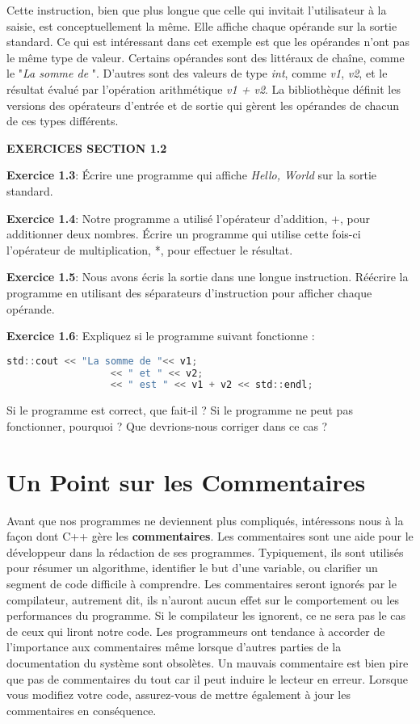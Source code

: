 Cette instruction, bien que plus longue que celle qui invitait l'utilisateur à la saisie, est conceptuellement la même. Elle affiche chaque opérande sur la sortie standard. Ce qui est intéressant dans cet exemple est que les opérandes n'ont pas le même type de valeur. Certains opérandes sont des littéraux de chaîne, comme le "\textit{La somme de }". D'autres sont des valeurs de type \textit{int}, comme \textit{v1}, \textit{v2}, et le résultat évalué par l'opération arithmétique \textit{v1 + v2}. La bibliothèque définit les versions des opérateurs d'entrée et de sortie qui gèrent les opérandes de chacun de ces types différents.

\medbreak

\textbf{EXERCICES SECTION 1.2}
\begin{shadebox}
	
	\textbf{Exercice 1.3}: Écrire une programme qui affiche \textit{Hello, World} sur la sortie standard.
	
	\textbf{Exercice 1.4}: Notre programme a utilisé l'opérateur d'addition, +, pour additionner deux nombres. Écrire un programme qui utilise cette fois-ci l'opérateur de multiplication, *, pour effectuer le résultat.
	
	\textbf{Exercice 1.5}: Nous avons écris la sortie dans une longue instruction. Réécrire la programme en utilisant des séparateurs d'instruction pour afficher chaque opérande.
	
	\textbf{Exercice 1.6}: Expliquez si le programme suivant fonctionne :
	
	\medbreak
	\begin{lstlisting}[language=C]
		std::cout << "La somme de "<< v1;
		          << " et " << v2;
		          << " est " << v1 + v2 << std::endl;
	\end{lstlisting}
	\medbreak
	
	Si le programme est correct, que fait-il ? Si le programme ne peut pas fonctionner, pourquoi ? Que devrions-nous corriger dans ce cas ?
\end{shadebox}  

\medbreak  

\section{Un Point sur les Commentaires}
Avant que nos programmes ne deviennent plus compliqués, intéressons nous à la façon dont C++ gère les \textbf{commentaires}. Les commentaires sont une aide pour le développeur dans la rédaction de ses programmes. Typiquement, ils sont utilisés pour résumer un algorithme, identifier le but d'une variable, ou clarifier un segment de code difficile à comprendre. Les commentaires seront ignorés par le compilateur, autrement dit, ils n'auront aucun effet sur le comportement ou les performances du programme.
Si le compilateur les ignorent, ce ne sera pas le cas de ceux qui liront notre code. Les programmeurs ont tendance à accorder de l'importance aux commentaires même lorsque d'autres parties de la documentation du système sont obsolètes. Un mauvais commentaire est bien pire que pas de commentaires du tout car il peut induire le lecteur en erreur. Lorsque vous modifiez votre code, assurez-vous de mettre également à jour les commentaires en conséquence.


